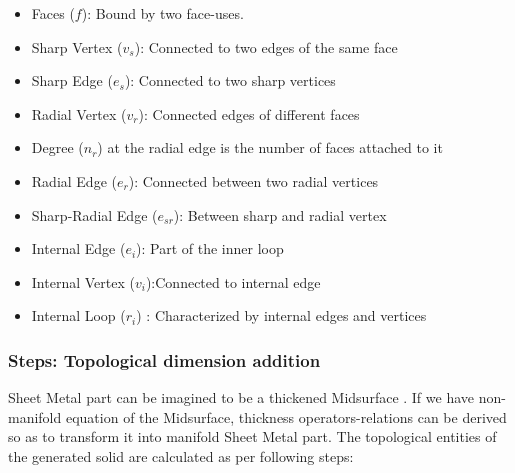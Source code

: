 	\begin{itemize} 
	[noitemsep,topsep=2pt,parsep=2pt,partopsep=2pt,label={},leftmargin=*]\label{list_topos}
	\item Faces ($f$): Bound by two face-uses.
	
	\item Sharp Vertex ($v_s$): Connected to two edges of the same face
	\item Sharp Edge ($e_s$): Connected to two sharp vertices

	\item Radial Vertex ($v_{r}$): Connected edges of different faces
	\item Degree ($n_{r}$) at the radial edge is the number of faces attached to it 
	\item Radial Edge ($e_{r}$): Connected between two radial vertices
	\item Sharp-Radial Edge ($e_{sr}$): Between sharp and radial vertex
	\item Internal Edge ($e_i$): Part of the inner loop
	\item Internal Vertex ($v_i$):Connected to internal edge
	\item Internal Loop ($r_i$) : Characterized by internal edges and vertices

	\end{itemize}



\subsubsection{Steps: Topological dimension addition}
Sheet Metal part can be imagined to be a thickened Midsurface \cite{SHLee2001}. If we have non-manifold equation of the Midsurface, thickness operators-relations can be derived so as to transform it into manifold Sheet Metal part. The topological entities of the generated solid are calculated as per following steps: %


